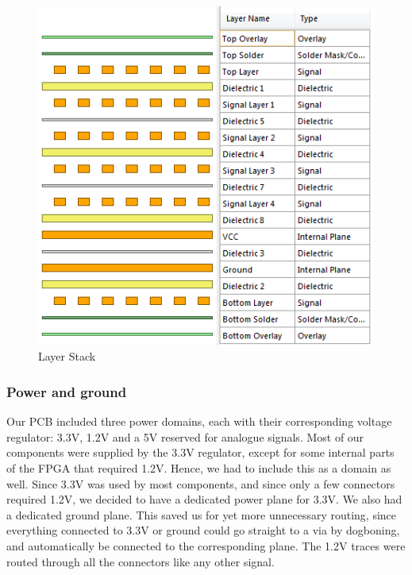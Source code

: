 \begin{figure}[h!]
\centering
\includegraphics[scale = 0.8]{images/Layers.png}
\caption{Layer Stack}
\label{fig:Layers}
\end{figure}

\subsubsection{Power and ground}
Our PCB included three power domains, each with their corresponding voltage regulator: 3.3V, 1.2V and a 5V reserved for analogue signals. Most of our components were supplied by the 3.3V regulator, except for some internal parts of the FPGA that required 1.2V. Hence, we had to include this as a domain as well. 
\newline
\newline
Since 3.3V was used by most components, and since only a few connectors required 1.2V, we decided to have a dedicated power plane for 3.3V. We also had a dedicated ground plane. This saved us for yet more unnecessary routing, since everything connected to 3.3V or ground could go straight to a via by dogboning, and automatically be connected to the corresponding plane. The 1.2V traces were routed through all the connectors like any other signal. 

